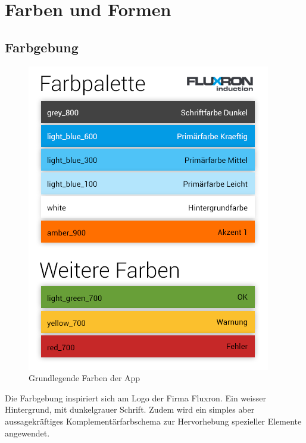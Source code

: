 
\section{Farben und Formen}
\label{sec:Farben und Formen}

\subsection{Farbgebung}
\label{subsec:Farbgebung}
\begin{figure}[H]
    \begin{center}
        \includegraphics[trim=0 200 0 50,clip,scale=0.7]{uiux/res/basic_colors}
    \end{center}
    \caption{Grundlegende Farben der App}
\end{figure}
Die Farbgebung inspiriert sich am Logo der Firma Fluxron. Ein weisser Hintergrund, mit dunkelgrauer Schrift. Zudem wird ein simples aber aussagekräftiges Komplementärfarbschema zur Hervorhebung spezieller Elemente angewendet.

